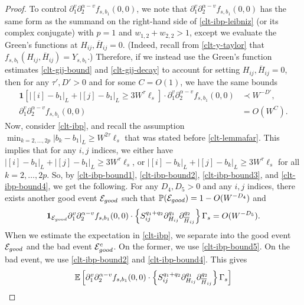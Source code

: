 \begin{proof}
To control $\partial_{1}^{v}\partial_{2}^{\alpha-v}f_{s,b_{1}}(0,0)$, we note that $\partial_{1}^{v}\partial_{2}^{\alpha-v}f_{s,b_{1}}(0,0)$ has the same form as the summand on the right-hand side of \eqref{clt-ibp-leibniz} (or its complex conjugate) with $p=1$ and $w_{1,2}+w_{2,2}>1$, except we evaluate the Green's functions at $H_{ij},\overline{H}_{ij}=0$. (Indeed, recall from \eqref{clt-y-taylor} that $f_{s,b_{1}}(H_{ij},\overline{H}_{ij})=Y_{s,b_{1}}$.) Therefore, if we instead use the Green's function estimates \eqref{clt-gij-bound} and \eqref{clt-gij-decay} to account for setting $H_{ij},\overline{H}_{ij}=0$, then for any $\tau',D'>0$ and for some $C=O(1)$, we have the same bounds
%
\begin{align}
\mathbf{1}[|[i]-b_{1}|_{L}+|[j]-b_{1}|_{L}\geq 3W^{\tau}\ell_{s}]\cdot\partial_{1}^{v}\partial_{2}^{\alpha-v}f_{s,b_{1}}(0,0)&\prec W^{-D'},\label{clt-ibp-bound3}\\
\partial_{1}^{v}\partial_{2}^{\alpha-v}f_{s,b_{1}}(0,0)&=O(W^{C}).\label{clt-ibp-bound4}
\end{align}
%
Now, consider \eqref{clt-ibp}, and recall the assumption $\min_{k=2,\ldots,2p}|b_{k}-b_{1}|_{L}\geq W^{2\tau}\ell_{s}$ that was stated before \eqref{clt-lemmafar}. This implies that for any $i,j$ indices, we either have $|[i]-b_{1}|_{L}+|[j]-b_{1}|_{L}\geq 3W^{\tau}\ell_{s}$, or $|[i]-b_{k}|_{L}+|[j]-b_{k}|_{L}\geq 3W^{\tau}\ell_{s}$ for all $k=2,\ldots,2p$. So, by \eqref{clt-ibp-bound1}, \eqref{clt-ibp-bound2}, \eqref{clt-ibp-bound3}, and \eqref{clt-ibp-bound4}, we get the following. For any $D_{4},D_{5}>0$ and any $i,j$ indices, there exists another good event ${\cal E}_{good}$ such that $\mathbb{P}({\cal E}_{good})=1-O(W^{-D_{4}})$ and
%
\begin{align}
\mathbf{1}_{{\cal E}_{good}}\partial_{1}^{v}\partial_{2}^{\alpha-v}f_{s,b_{1}}(0,0)\cdot\left\{S_{ij}^{q_{1}+q_{2}}\partial_{H_{ij}}^{q_{1}}\partial_{\overline{H}_{ij}}^{q_{2}}\right\}\Gamma_{s}=O(W^{-D_{5}}).\label{clt-ibp-bound5}
\end{align}
%
When we estimate the expectation in \eqref{clt-ibp}, we separate into the good event ${\cal E}_{good}$ and the bad event ${\cal E}_{good}^{c}$. On the former, we use \eqref{clt-ibp-bound5}. On the bad event, we use \eqref{clt-ibp-bound2} and \eqref{clt-ibp-bound4}. This gives
%
\begin{align}
&\E\left[\partial_{1}^{v}\partial_{2}^{\alpha-v}f_{s,b_{1}}(0,0)\cdot\left\{S_{ij}^{q_{1}+q_{2}}\partial_{H_{ij}}^{q_{1}}\partial_{\overline{H}_{ij}}^{q_{2}}\right\}\Gamma_{s}\right]\\

\end{align}
\end{proof}
